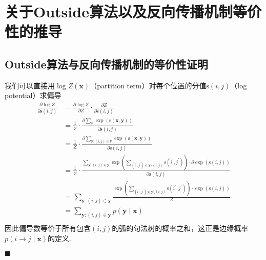\chapter{关于Outside算法以及反向传播机制等价性的推导}

\section{Outside算法与反向传播机制的等价性证明}\label{sec:outside-backprop}
我们可以直接用$\log Z(\boldsymbol{x})$（partition term）对每个位置的分值$\mathrm{s}(i, j)$（log potential）求偏导
\begin{equation}
  \label{eq:partial-derivative}
  \begin{split}
    \frac{\partial \log Z}{\partial \mathrm{s}(i, j)} & = \frac{\partial \log Z}{\partial Z} \cdot \frac{\partial Z}{\partial \mathrm{s}(i, j)}\\
    & =\frac{1}{Z} \cdot \frac{\partial \sum_{\boldsymbol{y}} \exp \left(\mathrm{s}(\boldsymbol{x}, \boldsymbol{y}) \right)}{\partial \mathrm{s}(i, j)}\\
    & =\frac{1}{Z} \cdot \frac{\partial \sum_{\boldsymbol{y}:(i,j) \in \boldsymbol{{y}}} \exp \left(\mathrm{s}(\boldsymbol{x}, \boldsymbol{y}) \right)}{\partial \mathrm{s}(i, j)}\\
    & =\frac{1}{Z} \cdot \frac{\sum_{\boldsymbol{y}:(i,j) \in \boldsymbol{{y}}} \exp \left( \sum_{(i^{\prime}, j^{\prime}) \in \boldsymbol{y}\setminus (i,j)} \mathrm{s}(i^{\prime}, j^{\prime}) \right)\cdot \partial \exp(\mathrm{s}(i, j))}{\partial \mathrm{s}(i, j)}\\
    & =\sum_{\boldsymbol{y}:(i,j) \in \boldsymbol{{y}}} \frac{\exp \left( \sum_{(i^{\prime}, j^{\prime}) \in \boldsymbol{y}\setminus (i,j)} \mathrm{s}(i^{\prime}, j^{\prime})\right)\cdot \exp(\mathrm{s}(i,j))}{Z}\\
    &= \sum_{\boldsymbol{y}:(i,j) \in \boldsymbol{{y}}} p(\boldsymbol{y}\mid\boldsymbol{x})\\
  \end{split}
\end{equation}
因此偏导数等价于所有包含$(i,j)$的弧的句法树的概率之和，这正是边缘概率$p(i \rightarrow j\mid\boldsymbol{x})$的定义.

\noindent$\blacksquare$


